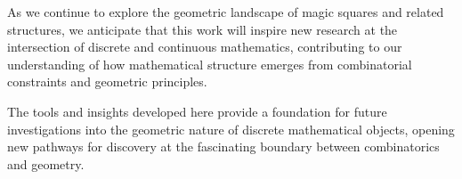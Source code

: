 As we continue to explore the geometric landscape of magic squares and related structures, we anticipate that this work will inspire new research at the intersection of discrete and continuous mathematics, contributing to our understanding of how mathematical structure emerges from combinatorial constraints and geometric principles.

The tools and insights developed here provide a foundation for future investigations into the geometric nature of discrete mathematical objects, opening new pathways for discovery at the fascinating boundary between combinatorics and geometry. 